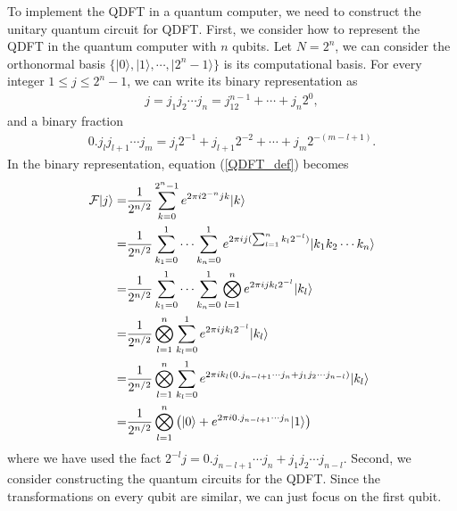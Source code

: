 \documentclass{article}
\newcommand{\ket}[1]{| #1 \rangle}  %
\begin{document}
To implement the QDFT in a quantum computer, we need to construct the unitary quantum circuit for QDFT. First, we consider how to represent the QDFT in the quantum computer with $n$ qubits. Let $N=2^n$, we can consider the orthonormal basis $\{\ket{0}, \ket{1}, \cdots, \ket{2^n-1}\}$ is its computational basis. For every integer $1\le j \le 2^n-1$, we can write its binary representation as 
\begin{align}
	j=j_1j_2\cdots j_n=j_12^{n-1}+\cdots+j_n2^0,
\end{align}
and a binary fraction 
\begin{align}
	0.j_lj_{l+1}\cdots j_m=j_l2^{-1}+j_{l+1}2^{-2}+\cdots + j_{m}2^{-(m-l+1)}.
\end{align}
In the binary representation, equation (\ref{QDFT_def}) becomes 
\begin{align}
	\mathcal{F}\ket{j} 
	=& \frac{1}{2^{n/2}} \sum_{k=0}^{2^n-1} e^{2\pi i 2^{-n}jk} \ket{k} \notag \\
	=& \frac{1}{2^{n/2}} \sum_{k_1=0}^{1}\cdots \sum_{k_n=0}^{1} e^{2\pi i j (\sum_{l=1}^{n}k_l2^{-l})} \ket{k_1k_2\cdots k_n} \notag \\
	=& \frac{1}{2^{n/2}} \sum_{k_1=0}^{1}\cdots \sum_{k_n=0}^{1}  \bigotimes_{l=1}^n e^{2\pi i j k_l2^{-l}} \ket{k_l} \notag \\
	=& \frac{1}{2^{n/2}} \bigotimes_{l=1}^n \sum_{k_l=0}^{1} e^{2\pi i j k_l2^{-l}} \ket{k_l} \notag \\
	=& \frac{1}{2^{n/2}} \bigotimes_{l=1}^n \sum_{k_l=0}^{1} e^{2\pi i  k_l ( 0.j_{n-l+1}\cdots j_n + j_1j_2\cdots j_{n-l})} \ket{k_l} \notag \\
	=& \frac{1}{2^{n/2}} \bigotimes_{l=1}^n \left( \ket{0} + e^{2\pi i   0.j_{n-l+1}\cdots j_n } \ket{1} \right)
\end{align}
where we have used the fact $2^{-l}j= 0.j_{n-l+1}\cdots j_n + j_1j_2\cdots j_{n-l}$.
Second, we consider constructing the quantum circuits for the QDFT. Since the transformations on every qubit are similar, we can just focus on the first qubit.
\end{document}
